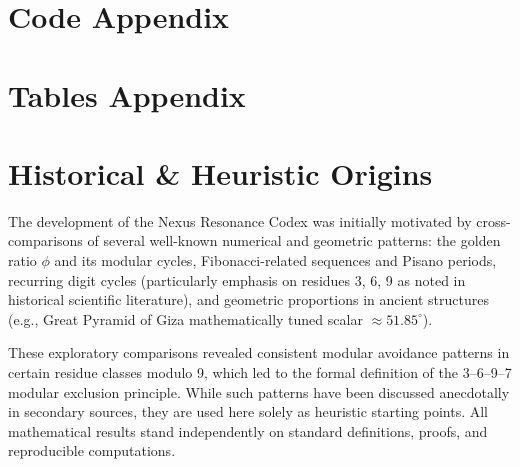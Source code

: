 \begin{appendices}
	\section{Code Appendix}
	
	\section{Tables Appendix}
	
	\section{Historical \& Heuristic Origins}
	The development of the Nexus Resonance Codex was initially motivated by cross-comparisons of several well-known numerical and geometric patterns: the golden ratio $\phi$ and its modular cycles, Fibonacci-related sequences and Pisano periods, recurring digit cycles (particularly emphasis on residues 3, 6, 9 as noted in historical scientific literature), and geometric proportions in ancient structures (e.g., Great Pyramid of Giza mathematically tuned scalar $\approx 51.85^\circ$).
	
	These exploratory comparisons revealed consistent modular avoidance patterns in certain residue classes modulo 9, which led to the formal definition of the 3--6--9--7 modular exclusion principle. While such patterns have been discussed anecdotally in secondary sources, they are used here solely as heuristic starting points. All mathematical results stand independently on standard definitions, proofs, and reproducible computations.
	
\end{appendices}